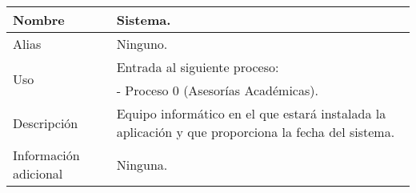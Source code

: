 \begin{center}
  \begin{tabular}{| l | p{9cm} |}
    \hline
    Nombre & \textbf{Sistema}.\\
    \hline
    Alias & Ninguno.\\
    \hline
    \multirow{2}{*}{Uso} & Entrada al siguiente proceso:\\
                         & - Proceso 0 (Asesorías Académicas).\\
    \hline
    Descripción & Equipo informático en el que estará instalada la aplicación y
                  que proporciona la fecha del sistema.\\
    \hline
    Información adicional & Ninguna.\\
    \hline
  \end{tabular}
\end{center}

